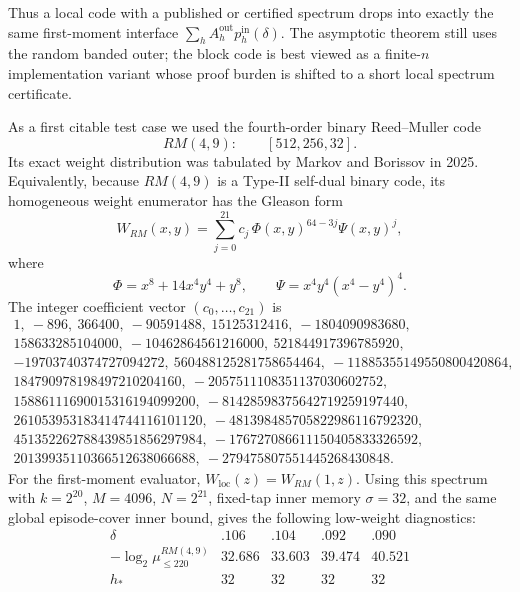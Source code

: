 
Thus a local code with a published or certified spectrum drops into exactly the same first-moment interface
\(\sum_h A_h^{\mathrm{out}}p_h^{\mathrm{in}}(\delta)\).  The asymptotic theorem still uses the random banded outer; the
block code is best viewed as a finite-\(n\) implementation variant whose proof burden is shifted to a short local
spectrum certificate.

As a first citable test case we used the fourth-order binary Reed--Muller code
\[
RM(4,9):\qquad [512,256,32].
\]
Its exact weight distribution was tabulated by Markov and Borissov in 2025.  Equivalently, because \(RM(4,9)\) is a
Type-II self-dual binary code, its homogeneous weight enumerator has the Gleason form
\[
W_{RM}(x,y)
=
\sum_{j=0}^{21} c_j\,
\Phi(x,y)^{64-3j}\Psi(x,y)^j,
\]
where
\[
\Phi=x^8+14x^4y^4+y^8,
\qquad
\Psi=x^4y^4(x^4-y^4)^4.
\]
The integer coefficient vector \((c_0,\ldots,c_{21})\) is
\[
\begin{gathered}
1,\ -896,\ 366400,\ -90591488,\ 15125312416,\ -1804090983680,\\
158633285104000,\ -10462864561216000,\ 521844917396785920,\\
-19703740374727094272,\ 560488125281758654464,\ -11885355149550800420864,\\
184790978198497210204160,\ -2057511108351137030602752,\\
15886111690015316194099200,\ -81428598375642719259197440,\\
261053953183414744116101120,\ -481398485705822986116792320,\\
451352262788439851856297984,\ -176727086611150405833326592,\\
20139935110366512638066688,\ -279475807551445268430848 .
\end{gathered}
\]
For the first-moment evaluator, \(W_{\mathrm{loc}}(z)=W_{RM}(1,z)\).  Using this spectrum with \(k=2^{20}\),
\(M=4096\), \(N=2^{21}\), fixed-tap inner memory \(\sigma=32\), and the same global episode-cover inner bound, gives
the following low-weight diagnostics:
\[
\begin{array}{c|rrrr}
\delta & .106 & .104 & .092 & .090\\
\hline
-\log_2 \mu_{\le220}^{RM(4,9)} & 32.686 & 33.603 & 39.474 & 40.521\\
h_* & 32 & 32 & 32 & 32
\end{array}
\]
